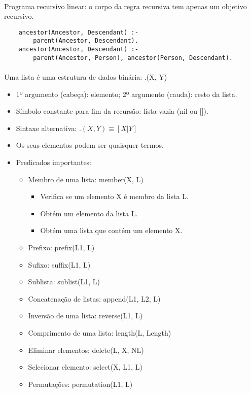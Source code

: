 \documentclass[../resumosPLOG.tex]{subfiles}
\begin{document}
\paragraph{}

Programa recursivo linear: o corpo da regra recursiva tem apenas um objetivo recursivo.
\begin{lstlisting}
    ancestor(Ancestor, Descendant) :-
        parent(Ancestor, Descendant).
    ancestor(Ancestor, Descendant) :- 
        parent(Ancestor, Person), ancestor(Person, Descendant).
\end{lstlisting}

\paragraph{}

Uma lista é uma estrutura de dados binária: .(X, Y)
\begin{itemize}
    \item 1º argumento (cabeça): elemento; 2º argumento (cauda): resto da lista.
    \item Símbolo constante para fim da recursão: lista vazia (nil ou []).
    \item Sintaxe alternativa: \(.(X, Y) \equiv [X | Y]\)
    \item Os seus elementos podem ser quaisquer termos.
    \item Predicados importantes:
    \begin{itemize}
        \item Membro de uma lista: member(X, L)
        \begin{itemize}
            \item Verifica se um elemento X é membro da lista L.
            \item Obtém um elemento da lista L.
            \item Obtém uma lista que contém um elemento X.
        \end{itemize}
        \item Prefixo: prefix(L1, L)
        \item Sufixo: suffix(L1, L)
        \item Sublista: sublist(L1, L)
        \item Concatenação de listas: append(L1, L2, L)
        \item Inversão de uma lista: reverse(L1, L)
        \item Comprimento de uma lista: length(L, Length)
        \item Eliminar elementos: delete(L, X, NL)
        \item Selecionar elemento: select(X, L1, L)
        \item Permutações: permutation(L1, L)
    \end{itemize}
\end{itemize}
\end{document}
